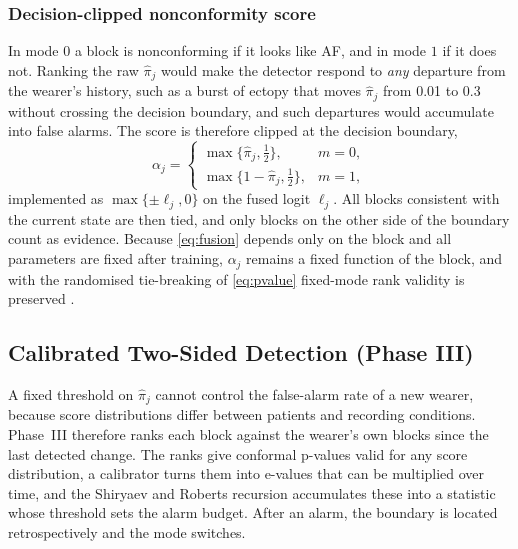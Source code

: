 \documentclass[preprint,12pt]{elsarticle}
\newcommand{\1}{\mathbf{1}}
\begin{document}
\subsubsection{Decision-clipped nonconformity score}
In mode $0$ a block is nonconforming if it looks like AF, and in mode $1$ if it does not. Ranking the raw $\hat\pi_j$ would make the detector respond to \emph{any} departure from the wearer's history, such as a burst of ectopy that moves $\hat\pi_j$ from 0.01 to 0.3 without crossing the decision boundary, and such departures would accumulate into false alarms. The score is therefore clipped at the decision boundary,
\begin{equation}
\alpha_j=\begin{cases}\max\{\hat\pi_j,\tfrac12\}, & m=0,\\ \max\{1-\hat\pi_j,\tfrac12\}, & m=1,\end{cases}
\label{eq:nonconf}
\end{equation}
implemented as $\max\{\pm\ell_j,0\}$ on the fused logit $\ell_j$. All blocks consistent with the current state are then tied, and only blocks on the other side of the boundary count as evidence. Because \eqref{eq:fusion} depends only on the block and all parameters are fixed after training, $\alpha_j$ remains a fixed function of the block, and with the randomised tie-breaking of \eqref{eq:pvalue} fixed-mode rank validity is preserved \cite{vovk2022alrw}.

\subsection{Calibrated Two-Sided Detection (Phase III)}
\label{sec:phase3}
A fixed threshold on $\hat\pi_j$ cannot control the false-alarm rate of a new wearer, because score distributions differ between patients and recording conditions. Phase~III therefore ranks each block against the wearer's own blocks since the last detected change. The ranks give conformal p-values valid for any score distribution, a calibrator turns them into e-values that can be multiplied over time, and the Shiryaev and Roberts recursion accumulates these into a statistic whose threshold sets the alarm budget. After an alarm, the boundary is located retrospectively and the mode switches.
\end{document}
